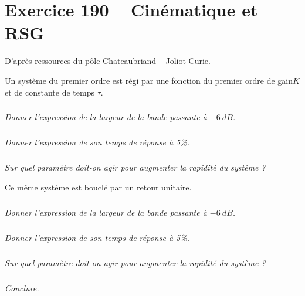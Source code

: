 \section*{Exercice 190 -- Cinématique et RSG}
\setcounter{exo}{0}

D'après ressources du pôle Chateaubriand -- Joliot-Curie.

Un système du premier ordre est régi par une fonction du premier ordre de gain$K$ et de constante de temps $\tau$.


\subparagraph{}
\textit{Donner l’expression de la largeur de la bande passante à $\SI{-6}{dB}$.}
\ifprof
\begin{corrige}

\end{corrige}
\else
\fi

\subparagraph{}
\textit{Donner l’expression de son temps de réponse à 5\%.}
\ifprof
\begin{corrige}

\end{corrige}
\else
\fi

\subparagraph{}
\textit{Sur quel paramètre doit-on agir pour augmenter la rapidité du système ?}
\ifprof
\begin{corrige}

\end{corrige}
\else
\fi

Ce même système est bouclé par un retour unitaire.

\subparagraph{}
\textit{Donner l’expression de la largeur de la bande passante à $\SI{-6}{dB}$.}
\ifprof
\begin{corrige}

\end{corrige}
\else
\fi

\subparagraph{}
\textit{Donner l’expression de son temps de réponse à 5\%. }
\ifprof
\begin{corrige}

\end{corrige}
\else
\fi

\subparagraph{}
\textit{Sur quel paramètre doit-on agir pour augmenter la rapidité du système ?}
\ifprof
\begin{corrige}

\end{corrige}
\else
\fi

\subparagraph{}
\textit{Conclure.}
\ifprof
\begin{corrige}

\end{corrige}
\else
\fi
